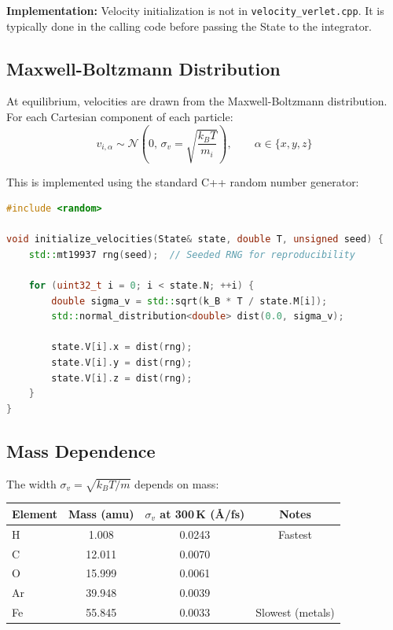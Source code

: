 \documentclass[11pt]{article}
\begin{document}
\textbf{Implementation:} Velocity initialization is not in \texttt{velocity\_verlet.cpp}. It is typically done in the calling code before passing the State to the integrator.

\subsection{Maxwell-Boltzmann Distribution}

At equilibrium, velocities are drawn from the Maxwell-Boltzmann distribution. For each Cartesian component of each particle:
\begin{equation}
v_{i,\alpha} \sim \mathcal{N}\!\left(0,\,\sigma_v = \sqrt{\frac{k_B T}{m_i}}\right), \qquad \alpha \in \{x,y,z\}
\end{equation}

This is implemented using the standard C++ random number generator:

\begin{lstlisting}[language=C++]
#include <random>

void initialize_velocities(State& state, double T, unsigned seed) {
    std::mt19937 rng(seed);  // Seeded RNG for reproducibility
    
    for (uint32_t i = 0; i < state.N; ++i) {
        double sigma_v = std::sqrt(k_B * T / state.M[i]);
        std::normal_distribution<double> dist(0.0, sigma_v);
        
        state.V[i].x = dist(rng);
        state.V[i].y = dist(rng);
        state.V[i].z = dist(rng);
    }
}
\end{lstlisting}

\subsection{Mass Dependence}

The width $\sigma_v = \sqrt{k_B T / m}$ depends on mass:

\begin{center}
\begin{tabular}{lccc}
\toprule
Element & Mass (amu) & $\sigma_v$ at 300\,K (\AA/fs) & Notes \\
\midrule
H & 1.008 & 0.0243 & Fastest \\
C & 12.011 & 0.0070 & \\
O & 15.999 & 0.0061 & \\
Ar & 39.948 & 0.0039 & \\
Fe & 55.845 & 0.0033 & Slowest (metals) \\
\bottomrule
\end{tabular}
\end{center}
\end{document}
